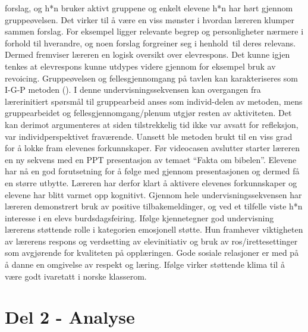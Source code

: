 \documentclass[12pt,twoside,onecolumn,norsk]{article}
\begin{document}
forslag, og h*n bruker aktivt gruppene og enkelt elevene h*n har hørt gjennom 
gruppeøvelsen. Det virker til å være en viss mønster i hvordan læreren klumper 
sammen forslag. For eksempel ligger relevante begrep og personligheter nærmere 
i forhold til hverandre, og noen forslag forgreiner seg i henhold til deres 
relevans. Dermed fremviser læreren en logisk oversikt over elevrespons. Det kunne 
igjen tenkes at elevrespons kunne utdypes videre gjennom for eksempel bruk av 
revoicing.
\newline
\newline
Gruppeøvelsen og fellesgjennomgang på tavlen kan karakteriseres som I-G-P 
metoden (). I denne undervisningssekvensen kan overgangen fra 
lærerinitiert spørsmål til gruppearbeid anses som individ-delen av metoden, 
mens gruppearbeidet og fellesgjennomgang/plenum utgjør resten av aktiviteten.
Det kan derimot argumenteres at siden tilstrekkelig tid ikke var avsatt for 
refleksjon, var individperspektivet fraværende. Uansett ble metoden brukt 
til en viss grad for å lokke fram elevenes forkunnskaper. Før videocasen 
avslutter starter læreren en ny sekvens med en PPT presentasjon av temaet 
``Fakta om bibelen''. Elevene har nå en god forutsetning for å følge med 
gjennom presentasjonen og dermed få en større utbytte. Læreren har derfor 
klart å aktivere elevenes forkunnskaper og elevene har blitt varmet opp 
kognitivt.
\newline
\newline
Gjennom hele undervisningssekvensen har læreren demonstrert bruk av positive 
tilbakemeldinger, og ved et tilfelle viste h*n interesse i en elevs 
burdsdagsfeiring. Ifølge  kjennetegner god 
undervisning lærerens støttende rolle i kategorien emosjonell støtte. Hun 
framhever viktigheten av lærerens respons og verdsetting av elevinitiativ 
og bruk av ros/irettesettinger som avgjørende for kvaliteten på opplæringen. 
Gode sosiale relasjoner er med på å danne en omgivelse av respekt og læring. 
Ifølge  virker støttende klima til å være godt ivaretatt 
i norske klasserom.

\section*{Del 2 - Analyse}
\end{document}
